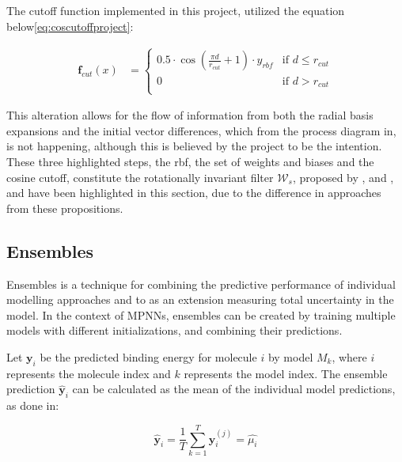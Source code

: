 The cutoff function implemented in this project, utilized the equation below\ref{eq:coscutoffproject}:

\begin{equation}\label{eq:coscutoffproject}
    \begin{aligned}
        \mathbf{f}_{cut}(x) & =
        \begin{cases}
            0.5 \cdot \cos \left( \frac{\pi d}{r_{cut}} + 1  \right) \cdot y_{rbf} & \text{if } d \leq r_{cut} \\
            0                                                                      & \text{if } d > r_{cut}    \\
        \end{cases}
    \end{aligned}
\end{equation}

This alteration allows for the flow of information from both the radial basis expansions and the initial vector differences,
which from the process diagram in\cite{PAINN}, is not happening, although this is believed by the project to be the intention.
These three highlighted steps, the rbf, the set of weights and biases and the cosine cutoff,
constitute the rotationally invariant filter $\mathcal{W}_{s}$, proposed by \cite{Gasteiger2020},
and \cite{Behler2011}, and have been highlighted in this section, due to the difference in approaches from these propositions.

\subsection{Ensembles}

Ensembles is a technique for combining the predictive performance of individual modelling approaches
and to as an extension measuring total uncertainty in the model.
In the context of MPNNs, ensembles can be created by training multiple models with different initializations,
and combining their predictions.

Let $\mathbf{y}_i$ be the predicted binding energy for molecule $i$ by model $M_k$, where $i$ represents the molecule index and $k$
represents the model index. The ensemble prediction $\hat{\mathbf{y}}_i$ can be calculated as the mean of the individual
model predictions, as done in\cite{Tran2019}:

\begin{equation}\label{eq:mean-ensemble}
    \hat{\mathbf{y}}_i = \frac{1}{T} \sum_{k=1}^T \mathbf{y}_i^{(j)} = \hat{\mu_{i}}
\end{equation}

